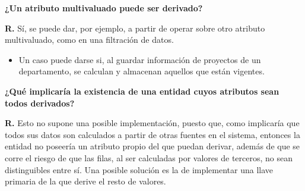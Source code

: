 \textbf{¿Un atributo multivaluado puede ser derivado?}

\textbf{R.} Sí, se puede dar, por ejemplo, a partir de operar sobre otro atributo multivaluado, como en una filtración de datos.
\begin{itemize}
    \item Un caso puede darse si, al guardar información de proyectos de un departamento, se calculan y almacenan aquellos que están vigentes.
\end{itemize}

\textbf{¿Qué implicaría la existencia de una entidad cuyos atributos sean todos derivados?}

\textbf{R.} Esto no supone una posible implementación, puesto que, como implicaría que todos sus datos son calculados a partir de otras fuentes en el sistema, entonces la entidad no poseería un atributo propio del que puedan derivar, además de que se corre el riesgo de que las filas, al ser calculadas por valores de terceros, no sean distinguibles entre sí. Una posible solución es la de implementar una llave primaria de la que derive el resto de valores.
